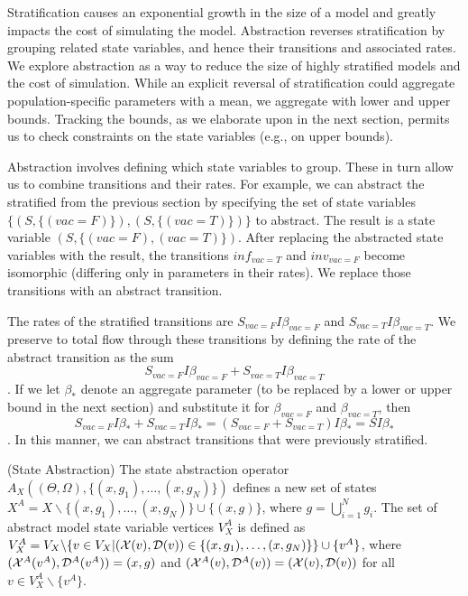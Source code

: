 Stratification causes an exponential growth in the size of a model and greatly impacts the cost of simulating the model.  Abstraction reverses stratification by grouping related state variables, and hence their transitions and associated rates.  We explore abstraction as a way to reduce the size of highly stratified models and the cost of simulation.  While an explicit reversal of stratification could aggregate population-specific parameters with a mean, we aggregate with lower and upper bounds.  Tracking the bounds, as we elaborate upon in the next section, permits us to check constraints on the state variables (e.g., on upper bounds).

Abstraction involves defining which state variables to group.  These in turn allow us to combine transitions and their rates.  For example, we can abstract the stratified \Petrinet{} from the previous section by specifying the set of state variables $\{(S, \{(vac=F)\}), (S, \{(vac=T)\})\}$ to abstract.  The result is a state variable $(S, \{(vac=F),(vac=T)\})$.  After replacing the abstracted state variables with the result, the transitions $inf_{vac=T}$ and $inv_{vac=F}$ become isomorphic (differing only in parameters in their rates).  We replace those transitions with an abstract transition.

The rates of the stratified transitions are $S_{vac=F}I\beta_{vac=F}$ and $S_{vac=T}I\beta_{vac=T}$.  We preserve to total flow through these transitions by defining the rate of the abstract transition as the sum $$S_{vac=F}I\beta_{vac=F}+S_{vac=T}I\beta_{vac=T}$$.  If we let $\beta_*$ denote an aggregate parameter (to be replaced by a lower or upper bound in the next section) and substitute it for $\beta_{vac=F}$ and $\beta_{vac=T}$, then $$S_{vac=F}I\beta_*+S_{vac=T}I\beta_* = (S_{vac=F}+S_{vac=T})I\beta_* = SI\beta_*$$.  In this manner, we can abstract transitions that were previously stratified.

\begin{definition} (State Abstraction)
	The state abstraction operator $A_X((\Theta, \Omega), \{(x,g_1), \ldots, (x, g_N)\})$ defines a new set of states $X^A = X \backslash \{(x,g_1), \ldots, (x, g_N)\} \cup \{(x, g)\}$, where $g = \bigcup_{i=1}^N g_i$.  The set of abstract model state variable vertices $V_X^A$ is defined as $V_X^A=V_X\backslash \{v\in V_X|({\cal X}(v), {\cal D}(v)) \in \{(x,g_1), \ldots, (x, g_N)\} \} \cup \{v^A \}$, where $({\cal X}^A(v^A), {\cal D}^A(v^A)) = (x, g)$ and $({\cal X}^A(v), {\cal D}^A(v)) = ({\cal X}(v), {\cal D}(v))$ for all $v \in V_X^A\backslash \{v^A\}$.
\end{definition}

